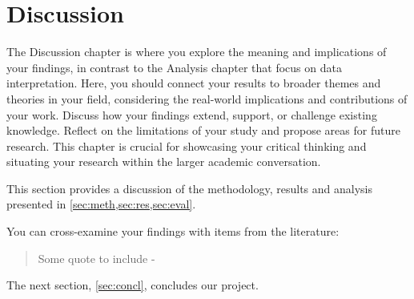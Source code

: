 \section{Discussion}
\label{sec:disc}

The Discussion chapter is where you explore the meaning and implications of your findings, in contrast to the Analysis chapter that focus on data interpretation. Here, you should connect your results to broader themes and theories in your field, considering the real-world implications and contributions of your work. Discuss how your findings extend, support, or challenge existing knowledge. Reflect on the limitations of your study and propose areas for future research. This chapter is crucial for showcasing your critical thinking and situating your research within the larger academic conversation.

This section provides a discussion of the methodology, results and analysis presented in \cref{sec:meth,sec:res,sec:eval}.

You can cross-examine your findings with items from the literature:
\begin{quote}
\centering
    Some quote to include - \citet{doe2017exploring}
\end{quote}

The next section, \cref{sec:concl}, concludes our project.